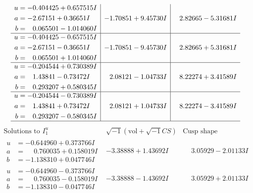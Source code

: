 \documentclass[1p]{elsarticle_modified}
\theoremstyle{definition}
\newcommand{\I}{\sqrt{-1}}
\begin{document}
$$\begin{array}{c|c|c}
\begin{aligned}
u &= -0.404425 + 0.657515 I \\
a &= -2.67151 + 0.36651 I \\
b &= \phantom{-}0.065501 - 1.014060 I\end{aligned}
 & -1.70851 + 9.45730 I & \phantom{-}2.82665 - 5.31681 I \\ \hline\begin{aligned}
u &= -0.404425 - 0.657515 I \\
a &= -2.67151 - 0.36651 I \\
b &= \phantom{-}0.065501 + 1.014060 I\end{aligned}
 & -1.70851 - 9.45730 I & \phantom{-}2.82665 + 5.31681 I \\ \hline\begin{aligned}
u &= -0.204544 + 0.730389 I \\
a &= \phantom{-}1.43841 - 0.73472 I \\
b &= \phantom{-}0.293207 + 0.580345 I\end{aligned}
 & \phantom{-}2.08121 - 1.04733 I & \phantom{-}8.22274 + 3.41589 I \\ \hline\begin{aligned}
u &= -0.204544 - 0.730389 I \\
a &= \phantom{-}1.43841 + 0.73472 I \\
b &= \phantom{-}0.293207 - 0.580345 I\end{aligned}
 & \phantom{-}2.08121 + 1.04733 I & \phantom{-}8.22274 - 3.41589 I\\
 \hline 
 \end{array}$$\newpage$$\begin{array}{c|c|c}  
\text{Solutions to }I^u_{1}& \I (\text{vol} + \sqrt{-1}CS) & \text{Cusp shape}\\
 \hline 
\begin{aligned}
u &= -0.644960 + 0.373766 I \\
a &= \phantom{-}0.760035 + 0.158019 I \\
b &= -1.138310 + 0.047746 I\end{aligned}
 & -3.38888 + 1.43692 I & \phantom{-}3.05929 - 2.01133 I \\ \hline\begin{aligned}
u &= -0.644960 - 0.373766 I \\
a &= \phantom{-}0.760035 - 0.158019 I \\
b &= -1.138310 - 0.047746 I\end{aligned}
 & -3.38888 - 1.43692 I & \phantom{-}3.05929 + 2.01133 I \\ \hline\begin{aligned}

\end{aligned}
\end{array}$$
\end{document}
